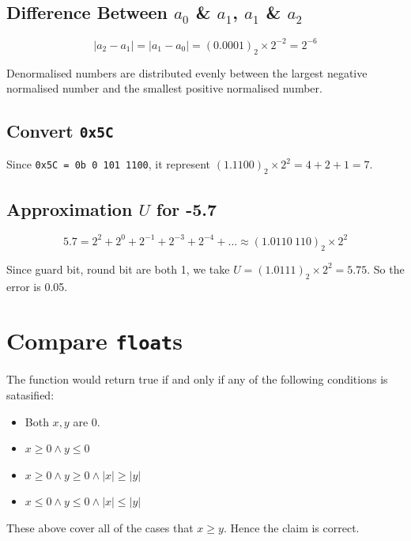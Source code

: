\documentclass[12pt, a4paper]{article}
\begin{document}
\subsection{Difference Between $a_0$ \& $a_1$, $a_1$ \& $a_2$}

$$|a_2-a_1|=|a_1-a_0|=(0.0001)_2\times2^{-2}=2^{-6}$$

Denormalised numbers are distributed evenly between the largest negative normalised number and the smallest positive normalised number.

\subsection{Convert \texttt{0x5C}}

Since \texttt{0x5C = 0b 0 101 1100}, it represent $(1.1100)_2\times2^2=4+2+1=7$.

\subsection{Approximation $U$ for -5.7}

$$5.7=2^2+2^0+2^{-1}+2^{-3}+2^{-4}+\dots\approx(1.0110\ 110)_2\times2^2$$

Since guard bit, round bit are both 1, we take $U=(1.0111)_2\times2^2=5.75$. So the error is 0.05.

\section{Compare \texttt{float}s}

The function would return true if and only if any of the following conditions is satasified:
\begin{itemize}
\item Both $x,y$ are 0.
\item $x\geq0\land y\leq0$
\item $x\geq0\land y\geq0\land|x|\geq|y|$
\item $x\leq0\land y\leq0\land|x|\leq|y|$
\end{itemize}
These above cover all of the cases that $x\geq y$. Hence the claim is correct.
\end{document}
